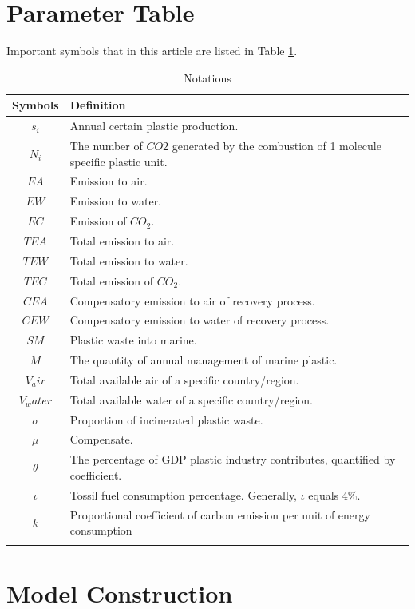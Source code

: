 \documentclass{mcmthesis}
\begin{document}
\section{Parameter Table}

Important symbols that in this article are listed in Table \ref{notation}.
\begin{table}[H] 
	\caption{Notations} 
	\center
	\begin{tabular}{cp{}}
		\toprule 
		Symbols &Definition  \\ 
		\midrule 
		$s_i $& Annual certain plastic production.  \\ 
		$N_i$ & The number of $CO2$ generated by the combustion of 1 molecule specific plastic unit. \\ 
		$EA$ & Emission to air. \\ 
		$EW$ & Emission to water.\\
		$EC$ & Emission of $CO_2$.\\
		$TEA$ & Total emission to air.\\
		$TEW$ & Total emission to water.\\
		$TEC$ & Total emission of $CO_2$.\\
		$CEA$ & Compensatory emission to air of recovery process.\\
		$CEW$ & Compensatory emission to water of recovery process.\\
		$SM$ & Plastic waste into marine.\\
		$M$ & The quantity of annual management of marine plastic.\\
		$V_air$ & Total available air of a specific country/region.\\
		$V_water$ & Total available water of a specific country/region.\\
		$\sigma$ & Proportion of incinerated plastic waste.\\
		$\mu$ & Compensate.\\
		$\theta$ & The percentage of GDP plastic industry contributes, quantified by coefficient.\\
		$\iota$ & Tossil fuel consumption percentage. Generally, $\iota$ equals 4\%.\\
		$k$ & Proportional coefficient of carbon emission per unit of
energy consumption\\
		\bottomrule 
		\label{notation}
	\end{tabular} 
\end{table}

\section{Model Construction}
\label{lp}
\end{document}
